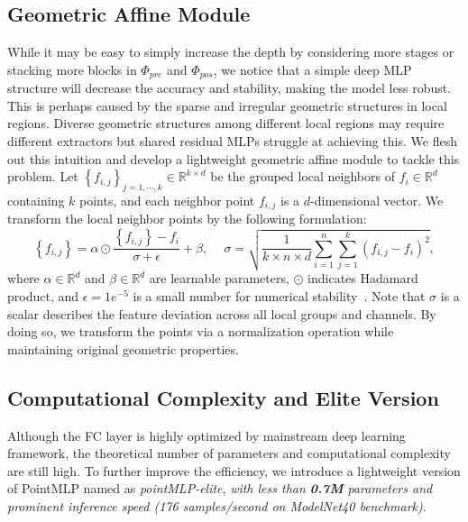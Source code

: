 \subsection{Geometric Affine Module}
While it may be easy to simply increase the depth by considering more stages or stacking more blocks in $\Phi_{pre}$ and $\Phi_{pos}$, we notice that a simple deep MLP structure will decrease the accuracy and stability, making the model less robust. This is perhaps caused by the sparse and irregular geometric structures in local regions. Diverse geometric structures among different local regions may require different extractors but shared residual MLPs struggle at achieving this.  We flesh out this intuition and develop a lightweight geometric affine module to tackle this problem. Let $\left \{ f_{i,j} \right \}_{j=1,\cdots, k}\in \mathbb{R}^{k\times d}$  be the grouped local neighbors of $f_i\in \mathbb{R}^{d}$ containing $k$ points, and each neighbor point $f_{i,j}$ is a $d$-dimensional vector. We transform the local neighbor points by the following formulation:
\begin{equation}
    \left \{ f_{i,j} \right \} = \alpha\odot\frac{\left \{ f_{i,j} \right \}-f_i}{\sigma + \epsilon} + \beta, 
    \quad \   
    \sigma  =\sqrt{\frac{1}{k\times n \times d}\sum_{i=1}^n\sum_{j=1}^{k}\left(f_{i,j}-f_{i}\right)^2},
\end{equation}
where $\alpha\in\mathbb{R}^{d}$ and $\beta\in\mathbb{R}^{d}$ are learnable parameters, $\odot$ indicates Hadamard product, and $\epsilon=1e^{-5}$ is a small number for numerical stability~\citep{ioffe2015batch,wu2018group,dixon1951introduction}. Note that $\sigma$ is a scalar describes the feature deviation across all local groups and channels.  By doing so, we transform the points via a normalization operation while maintaining original geometric properties.

\subsection{Computational Complexity and Elite Version}
Although the FC layer is highly optimized by mainstream deep learning framework, the theoretical number of parameters and computational complexity are still high. To further improve the efficiency, we introduce a lightweight version of PointMLP named as \textit{pointMLP-elite}, \textit{with less than \textbf{0.7M} parameters and prominent inference speed (176 samples/second on ModelNet40 benchmark)}. 

